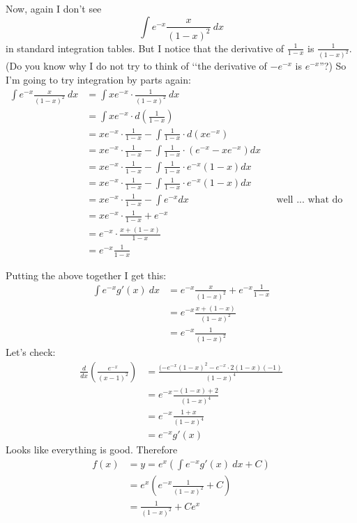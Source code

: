 Now, again I don't see
\[
\int e^{-x} \frac{x}{(1-x)^2}\ dx
\]
in standard integration tables.
But I notice that the derivative of $\frac{1}{1-x}$ is $\frac{1}{(1-x)^2}$.
(Do you know why I do not try to think of \lq\lq the derivative of $-e^{-x}$ is
$e^{-x}$''?)
So I'm going to try integration by parts again:
\begin{align*}
\int e^{-x} \frac{x}{(1-x)^2}\ dx
&= \int xe^{-x} \cdot \frac{1}{(1-x)^2} \ dx \\
&= \int xe^{-x} \cdot d \left( \frac{1}{1-x} \right) \\
&= xe^{-x} \cdot \frac{1}{1-x}
   - \int \frac{1}{1-x} \cdot d \left( xe^{-x} \right)
   \\
&= xe^{-x} \cdot \frac{1}{1-x}
   - \int \frac{1}{1-x} \cdot \left( e^{-x} - xe^{-x} \right) dx
   \\
&= xe^{-x} \cdot \frac{1}{1-x}
   - \int \frac{1}{1-x} \cdot e^{-x} \left( 1 - x \right) dx
   \\
&= xe^{-x} \cdot \frac{1}{1-x}
   - \int \frac{1}{1-x} \cdot e^{-x} \left( 1 - x \right) dx
   \\
&= xe^{-x} \cdot \frac{1}{1-x}
   - \int e^{-x} dx & & \text{well ... what do you know ...}
   \\
&= xe^{-x} \cdot \frac{1}{1-x}
   + e^{-x}
   \\
&= e^{-x} \cdot \frac{x + (1-x)}{1-x}
   \\
&= e^{-x} \frac{1}{1-x}
\end{align*}


Putting the above together I get this:
\begin{align*}
\int e^{-x} g'(x) \ dx
&= e^{-x} \frac{x}{(1-x)^2} 
+ e^{-x} \frac{1}{1-x}
\\
&=  e^{-x} \frac{x + (1-x)}{(1-x)^2}
\\
&=  e^{-x} \frac{1}{(1-x)^2}
\end{align*}
Let's check:
\begin{align*}
\frac{d}{dx} \left( \frac{e^{-x}}{(x-1)^2} \right)
&= \frac{(-e^{-x}(1-x)^2 - e^{-x} \cdot 2(1-x)(-1)}{(1-x)^4} \\
&= e^{-x} \frac{-(1-x) +  2}{(1-x)^4} \\
&= e^{-x} \frac{1+x}{(1-x)^4} \\
&= e^{-x} g'(x)
\end{align*}
Looks like everything is good.
Therefore
\begin{align*}
f(x)
&= y = e^x \left( \int e^{-x} g'(x) \ dx + C \right) \\
&= e^x \left( e^{-x} \frac{1}{(1-x)^2} + C \right) \\
&= \frac{1}{(1-x)^2} + C e^x
\end{align*}


